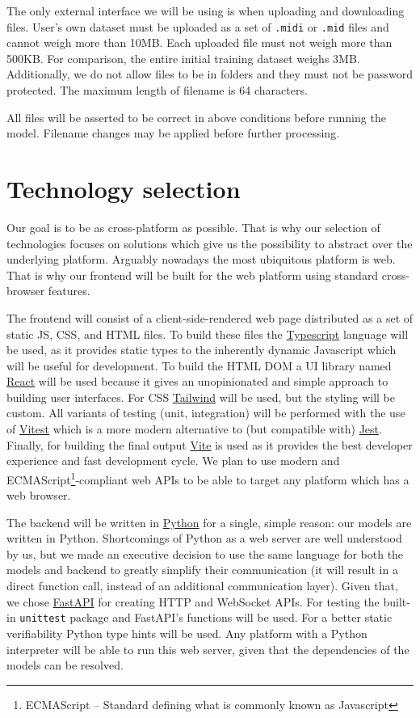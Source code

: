 \documentclass{article}
\begin{document}
The only external interface we will be using is when uploading and downloading files. User's own dataset must be uploaded as a set of \texttt{.midi} or \texttt{.mid} files and cannot weigh more than 10MB. Each uploaded file must not weigh more than 500KB. For comparison, the entire initial training dataset weighs 3MB. Additionally, we do not allow files to be in folders and they must not be password protected. The maximum length of filename is 64 characters.

All files will be asserted to be correct in above conditions before running the model. Filename changes may be applied before further processing.


\section{Technology selection} %

Our goal is to be as cross-platform as possible. That is why our selection of technologies focuses on solutions which give us the possibility to abstract over the underlying platform. Arguably nowadays the most ubiquitous platform is web. That is why our frontend will be built for the web platform using standard cross-browser features.

The frontend will consist of a client-side-rendered web page distributed as a set of static JS, CSS, and HTML files. To build these files the \href{https://www.typescriptlang.org/}{Typescript} language will be used, as it provides static types to the inherently dynamic Javascript which will be useful for development. To build the HTML DOM a UI library named \href{https://reactjs.org/}{React} will be used because it gives an unopinionated and simple approach to building user interfaces. For CSS \href{https://tailwindcss.com/}{Tailwind} will be used, but the styling will be custom. All variants of testing (unit, integration) will be performed with the use of \href{https://vitest.dev/}{Vitest} which is a more modern alternative to (but compatible with) \href{https://jestjs.io/}{Jest}. Finally, for building the final output \href{https://vitejs.dev/}{Vite} is used as it provides the best developer experience and fast development cycle. We plan to use modern and ECMAScript\footnote{ECMAScript -- Standard defining what is commonly known as Javascript}-compliant web APIs to be able to target any platform which has a web browser.

The backend will be written in \href{https://www.python.org/}{Python} for a single, simple reason: our models are written in Python. Shortcomings of Python as a web server are well understood by us, but we made an executive decision to use the same language for both the models and backend to greatly simplify their communication (it will result in a direct function call, instead of an additional communication layer). Given that, we chose \href{https://fastapi.tiangolo.com/}{FastAPI} for creating HTTP and WebSocket APIs. For testing the built-in \texttt{unittest} package and FastAPI's functions will be used. For a better static verifiability Python type hints will be used. Any platform with a Python interpreter will be able to run this web server, given that the dependencies of the models can be resolved.
\end{document}
